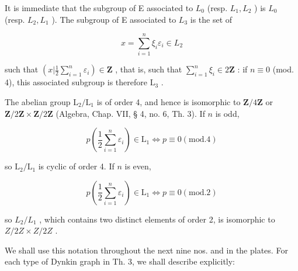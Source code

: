 It is immediate that the subgroup of E associated to \(L_{0}\) (resp. \(L_{1}, L_{2}\) ) is \(L_{0}\) (resp. \(L_{2}, L_{1}\) ). The subgroup of E associated to \(L_{3}\) is the set of

\[
x = \sum_ {i = 1} ^ {n} \xi_ {i} \varepsilon_ {i} \in L _ {2}
\]

such that \((x|\frac{1}{2}\sum_{i = 1}^{n}\varepsilon_i)\in \mathbf{Z}\) , that is, such that \(\sum_{i = 1}^{n}\xi_{i}\in 2\mathbf{Z}\) : if \(n\equiv 0\) (mod. 4), this associated subgroup is therefore \(\mathrm{L}_3\) .

The abelian group \(\mathrm{L}_2 / \mathrm{L}_1\) is of order 4, and hence is isomorphic to \(\mathbf{Z} / 4\mathbf{Z}\) or \(\mathbf{Z} / 2\mathbf{Z} \times \mathbf{Z} / 2\mathbf{Z}\) (Algebra, Chap. VII, § 4, no. 6, Th. 3). If \(n\) is odd,

\[
p (\frac {1}{2} \sum_ {i = 1} ^ {n} \varepsilon_ {i}) \in \mathrm{L} _ {1} \Leftrightarrow p \equiv 0 (\mathrm{mod.} 4)
\]

so \(\mathrm{L}_2 / \mathrm{L}_1\) is cyclic of order 4. If \(n\) is even,

\[
p (\frac {1}{2} \sum_ {i = 1} ^ {n} \varepsilon_ {i}) \in \mathrm{L} _ {1} \Leftrightarrow p \equiv 0 (\mathrm{mod.} 2)
\]

so \(L_{2}/L_{1}\) , which contains two distinct elements of order 2, is isomorphic to \(Z/2Z \times Z/2Z\) .

We shall use this notation throughout the next nine nos. and in the plates. For each type of Dynkin graph in Th. 3, we shall describe explicitly:


